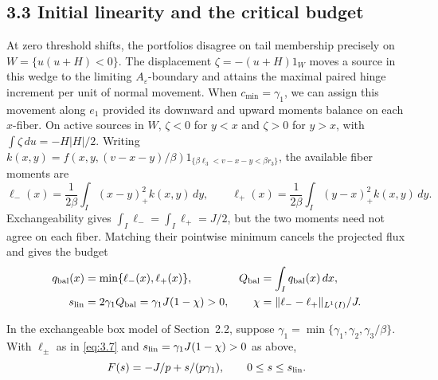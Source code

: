 \subsection{3.3 Initial linearity and the critical budget}\label{sec:balanced-profile}
At zero threshold shifts, the portfolios disagree on tail membership precisely on \(W=\{u(u+H)<0\}\). The displacement \(\zeta=-(u+H)1_W\) moves a source in this wedge to the limiting \(A_\varepsilon\)-boundary and attains the maximal paired hinge increment per unit of normal movement. When \(c_{\min}=\gamma_1\), we can assign this movement along \(e_1\) provided its downward and upward moments balance on each \(x\)-fiber. On active sources in \(W\), \(\zeta<0\) for \(y<x\) and \(\zeta>0\) for \(y>x\), with \(\int\zeta\,du=-H|H|/2\). Writing \(k(x,y)=f(x,y,(v-x-y)/\beta)1_{\{\beta\ell_3<v-x-y<\beta r_3\}}\), the available fiber moments are
\begin{equation}
\ell_-(x)=\frac1{2\beta}\int_I(x-y)_+^2k(x,y)\,dy,\qquad
\ell_+(x)=\frac1{2\beta}\int_I(y-x)_+^2k(x,y)\,dy.
\tag{3.7}\label{eq:3.7}
\end{equation}
Exchangeability gives \(\int_I\ell_-=\int_I\ell_+=J/2\), but the two moments need not agree on each fiber. Matching their pointwise minimum cancels the projected flux and gives the budget
\[
\begin{aligned}
q_{\rm bal}(x)&=\min\{\ell_-(x),\ell_+(x)\},&
Q_{\rm bal}&=\int_I q_{\rm bal}(x)\,dx,\\
s_{\rm lin}&=2\gamma_1Q_{\rm bal}=\gamma_1J(1-\chi)>0,&
\chi&=\|\ell_--\ell_+\|_{L^1(I)}/J.
\end{aligned}
\]
\begin{proposition}\label{prop:balanced-linear-profile} In the exchangeable box model of Section~2.2, suppose \(\gamma_1=\min\{\gamma_1,\gamma_2,\gamma_3/\beta\}\). With \(\ell_\pm\) as in \eqref{eq:3.7} and \(s_{\rm lin}=\gamma_1J(1-\chi)>0\) as above,
\begin{equation*}
F(s)=-J/p+s/(p\gamma_1),\qquad 0\le s\le s_{\rm lin}.
\end{equation*}
\end{proposition}

